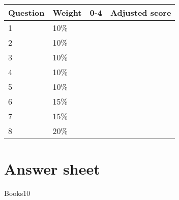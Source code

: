\documentclass[a4paper,12pt]{book}
\begin{document}
{\begin{center}
            \begin{tabular}{ | l | l | l | l | }
                \hline
                \textbf{ Question } & \textbf{ Weight } & \textbf{ 0-4 } & \textbf{ Adjusted score }
                \\ \hline
                
                1 & 10\% & &    \\ \hline
                
                2 & 10\% & &    \\ \hline
                
                3 & 10\% & &    \\ \hline
                
                4 & 10\% & &    \\ \hline
                
                5 & 10\% & &    \\ \hline
                
                6 & 15\% & &    \\ \hline
                
                7 & 15\% & &    \\ \hline
                
                8 & 20\% & &    \\ \hline
                
                
            \end{tabular}
        \end{center}
    }

    \hrulefill
 
    \section*{Answer sheet}

\begin{answersheetquestion}{1}{Books}{10}
\iftoggle{answerkey}{ \begin{answer} 3 + 4 = 7 books \end{answer} }{}
\end{answersheetquestion}
\end{document}
